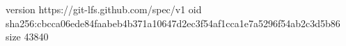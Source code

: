 version https://git-lfs.github.com/spec/v1
oid sha256:cbcca06ede84faabeb4b371a10647d2ec3f54af1cca1e7a5296f54ab2c3d5b86
size 43840
